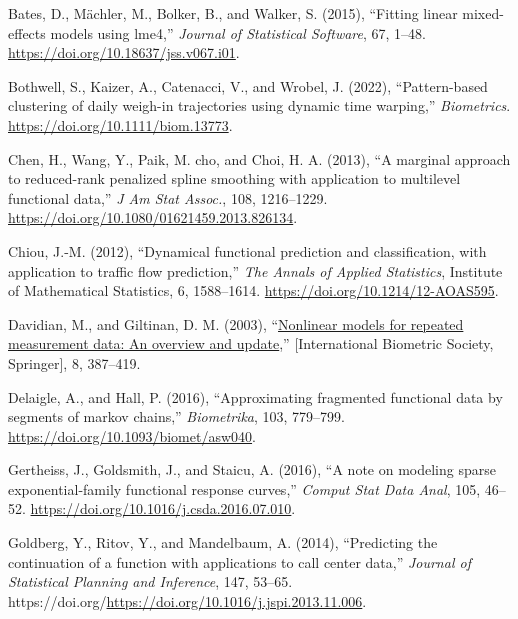 \documentclass[
  11pt,
]{article}
\newlength{\cslhangindent}
\newlength{\cslentryspacingunit} %
\newenvironment{CSLReferences}[2] %
 {%
  \setlength{\parindent}{0pt}
  \ifodd #1
  \let\oldpar\par
  \def\par{\hangindent=\cslhangindent\oldpar}
  \fi
  \setlength{\parskip}{#2\cslentryspacingunit}
 }%
 {}
\begin{document}
\hypertarget{refs}{}
\begin{CSLReferences}{1}{0}
\leavevmode{}%
Bates, D., Mächler, M., Bolker, B., and Walker, S. (2015), {``Fitting
linear mixed-effects models using {lme4},''} \emph{Journal of
Statistical Software}, 67, 1--48.
\url{https://doi.org/10.18637/jss.v067.i01}.

\leavevmode{}%
Bothwell, S., Kaizer, A., Catenacci, V., and Wrobel, J. (2022),
{``Pattern-based clustering of daily weigh-in trajectories using dynamic
time warping,''} \emph{Biometrics}.
\url{https://doi.org/10.1111/biom.13773}.

\leavevmode{}%
Chen, H., Wang, Y., Paik, M. cho, and Choi, H. A. (2013), {``A marginal
approach to reduced-rank penalized spline smoothing with application to
multilevel functional data,''} \emph{J Am Stat Assoc.}, 108, 1216--1229.
\url{https://doi.org/10.1080/01621459.2013.826134}.

\leavevmode{}%
Chiou, J.-M. (2012), {``Dynamical functional prediction and
classification, with application to traffic flow prediction,''}
\emph{The Annals of Applied Statistics}, Institute of Mathematical
Statistics, 6, 1588--1614. \url{https://doi.org/10.1214/12-AOAS595}.

\leavevmode{}%
Davidian, M., and Giltinan, D. M. (2003),
{``\href{http://www.jstor.org/stable/1400665}{Nonlinear models for
repeated measurement data: An overview and update},''} {[}International
Biometric Society, Springer{]}, 8, 387--419.

\leavevmode{}%
Delaigle, A., and Hall, P. (2016), {``Approximating fragmented
functional data by segments of markov chains,''} \emph{Biometrika}, 103,
779--799. \url{https://doi.org/10.1093/biomet/asw040}.

\leavevmode{}%
Gertheiss, J., Goldsmith, J., and Staicu, A. (2016), {``A note on
modeling sparse exponential-family functional response curves,''}
\emph{Comput Stat Data Anal}, 105, 46--52.
\url{https://doi.org/10.1016/j.csda.2016.07.010}.

\leavevmode{}%
Goldberg, Y., Ritov, Y., and Mandelbaum, A. (2014), {``Predicting the
continuation of a function with applications to call center data,''}
\emph{Journal of Statistical Planning and Inference}, 147, 53--65.
https://doi.org/\url{https://doi.org/10.1016/j.jspi.2013.11.006}.


\end{CSLReferences}
\end{document}
